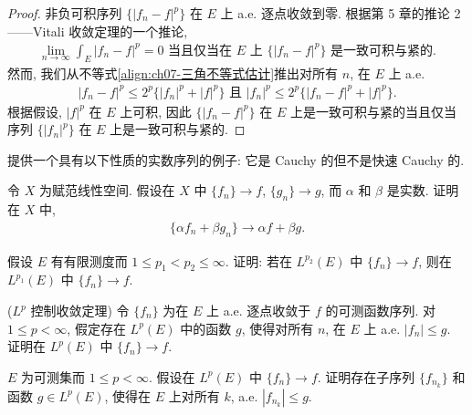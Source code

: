 \documentclass[../../main.tex]{subfiles}
\begin{document}
\begin{proof}
非负可积序列 $\{|f_{n}-f|^{p}\}$ 在 $E$ 上 a.e. 逐点收敛到零. 根据第 5 章的推论 2——Vitali 收敛定理的一个推论,
\begin{align*}
\lim_{n\to\infty}\int_{E}|f_{n}-f|^{p}=0\text{ 当且仅当在 }E\text{ 上 }\{|f_{n}-f|^{p}\}\text{ 是一致可积与紧的}.
\end{align*}
然而, 我们从不等式\eqref{align:ch07-三角不等式估计}推出对所有 $n$, 在 $E$ 上 a.e.
\begin{align*}
|f_{n}-f|^{p}\leqslant 2^{p}\{|f_{n}|^{p}+|f|^{p}\}\text{ 且 }|f_{n}|^{p}\leqslant 2^{p}\{|f_{n}-f|^{p}+|f|^{p}\}.
\end{align*}
根据假设, $|f|^{p}$ 在 $E$ 上可积, 因此 $\{|f_{n}-f|^{p}\}$ 在 $E$ 上是一致可积与紧的当且仅当序列 $\{|f_{n}|^{p}\}$ 在 $E$ 上是一致可积与紧的.
\end{proof}

\begin{exercise}\label{exercise:ch07-23}
提供一个具有以下性质的实数序列的例子: 它是 Cauchy 的但不是快速 Cauchy 的.
\end{exercise}

\begin{exercise}\label{exercise:ch07-24}
令 $X$ 为赋范线性空间. 假设在 $X$ 中 $\{f_{n}\}\to f$, $\{g_{n}\}\to g$, 而 $\alpha$ 和 $\beta$ 是实数. 证明在 $X$ 中,
\begin{align*}
\{\alpha f_{n}+\beta g_{n}\}\to\alpha f+\beta g.
\end{align*}
\end{exercise}

\begin{exercise}\label{exercise:ch07-25}
假设 $E$ 有有限测度而 $1\leqslant p_{1}<p_{2}\leqslant\infty$. 证明: 若在 $L^{p_{2}}(E)$ 中 $\{f_{n}\}\to f$, 则在 $L^{p_{1}}(E)$ 中 $\{f_{n}\}\to f$.
\end{exercise}

\begin{exercise}\label{exercise:ch07-26}
($L^{p}$ 控制收敛定理) 令 $\{f_{n}\}$ 为在 $E$ 上 a.e. 逐点收敛于 $f$ 的可测函数序列. 对 $1\leqslant p<\infty$, 假定存在 $L^{p}(E)$ 中的函数 $g$, 使得对所有 $n$, 在 $E$ 上 a.e. $|f_{n}|\leqslant g$. 证明在 $L^{p}(E)$ 中 $\{f_{n}\}\to f$.
\end{exercise}

\begin{exercise}\label{exercise:ch07-27}
$E$ 为可测集而 $1\leqslant p<\infty$. 假设在 $L^{p}(E)$ 中 $\{f_{n}\}\to f$. 证明存在子序列 $\{f_{n_{k}}\}$ 和函数 $g\in L^{p}(E)$, 使得在 $E$ 上对所有 $k$, a.e. $|f_{n_{k}}|\leqslant g$.
\end{exercise}
\end{document}
